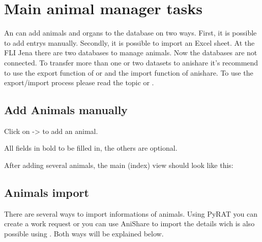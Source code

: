 \documentclass[letterpaper,10pt,openany,oneside,english]{sphinxmanual}
\begin{document}
\chapter{Main animal manager tasks}
\label{\detokenize{index:main-animal-manager-tasks}}
An  can add animals and organs to the database on two ways. First, it is possible to
add entrys manually. Secondly, it is possible to import an Excel sheet. At the FLI Jena there are two
databases to manage animals. Now the databases are not connected. To transfer more than one or two datasets
to anishare it’s recommend to use the export function of  or  and the import function of anishare.
To use the export/import process please read the topic  or .

\noindent{}


\section{Add Animals manually}
\label{\detokenize{index:add-animals-manually}}
Click on  -\textgreater{}  to add an animal.

\noindent{}

All fields in bold  to be filled in, the others are optional.

After adding several animals, the main (index) view should look like this:

\noindent{}


\section{Animals import}
\label{\detokenize{index:animals-import}}
There are several ways to import informations of animals. Using PyRAT you can create a work request or you can use AniShare to import the details
wich is also possible using . Both ways will be explained below.
\end{document}
